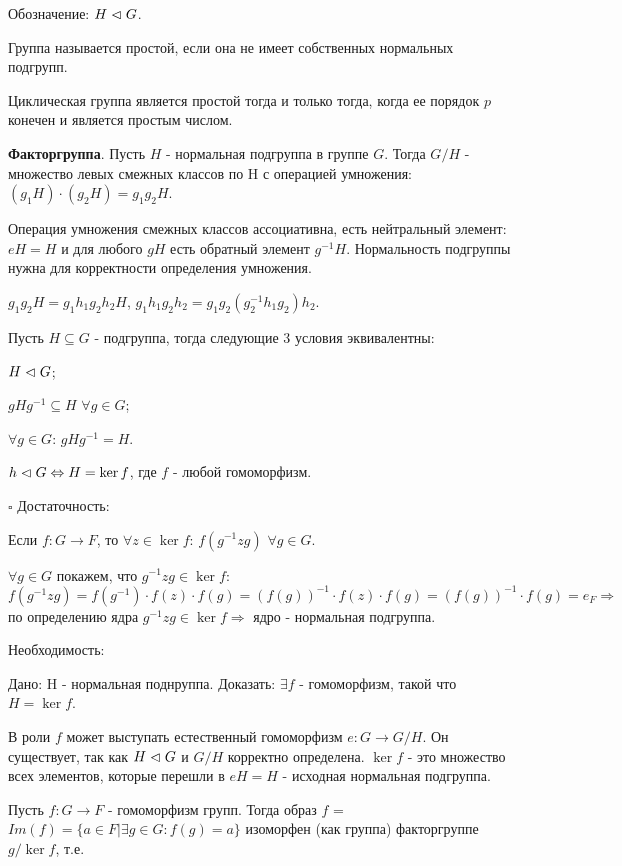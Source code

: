 \documentclass[../main.tex]{subfiles}
\begin{document}
Обозначение: $H \vartriangleleft G$.

\void
{} Группа называется простой, если она не имеет собственных нормальных подгрупп.

\void
{} Циклическая группа является простой тогда и только тогда, когда ее порядок
$p$ конечен и является простым числом.

\void
{} \textbf{Факторгруппа}. Пусть $H$ - нормальная подгруппа в группе $G$. Тогда $G/H$ - множество
левых смежных классов по H с операцией умножения: $(g_1H)\cdot(g_2H) = g_1g_2H$.

\void
{} Операция умножения смежных классов ассоциативна, есть нейтральный элемент: $eH = H$ и
для любого $gH$ есть обратный элемент $g^{-1}H$. Нормальность подгруппы нужна для корректности
определения умножения.

$g_1g_2H = g_1h_1g_2h_2H$, $g_1h_1g_2h_2 = g_1g_2(g_2^{-1}h_1g_2)h_2$.

\void
{} Пусть $H\subseteq G$ - подгруппа, тогда следующие 3 условия эквивалентны:

\void{} $H\vartriangleleft G$;

\void{} $gHg^{-1}\subseteq H$ $\forall g\in G$;

\void{} $\forall g\in G$: $gHg^{-1} = H$.

\void
{} $h\vartriangleleft G \Leftrightarrow H = \ker{f}$, где $f$ - любой гомоморфизм.

\void
$\square$ Достаточность:

Если $f: G\rightarrow F$, то $\forall z\in \ker{f}$: $f(g^{-1}zg)$ $\forall g\in G$.

$\forall g\in G$ покажем, что $g^{-1}zg \in \ker{f}$: $f(g^{-1}zg) = f(g^{-1})\cdot f(z)\cdot f(g) =
(f(g))^{-1}\cdot f(z)\cdot f(g) = (f(g))^{-1}\cdot f(g) = e_F \Rightarrow$ по определению ядра
$g^{-1}zg\in \ker{f} \Rightarrow$ ядро - нормальная подгруппа.

\void
Необходимость:

Дано: H - нормальная поднруппа. Доказать: $\exists f$ - гомоморфизм, такой что $H = \ker{f}$.

В роли $f$ может выступать естественный гомоморфизм $e: G\rightarrow G/H$. Он существует,
так как $H\vartriangleleft G$ и $G/H$ корректно определена. $\ker{f}$ - это множество всех элементов,
которые перешли в $eH = H$ - исходная нормальная подгруппа.

\void
{}

Пусть $f: G\rightarrow F$ - гомоморфизм групп. Тогда образ $f$ = $Im(f) = \{ a\in F\vert \exists g\in G: f(g) = a\}$
изоморфен (как группа) факторгруппе $g/\ker{f}$, т.е.
\end{document}
